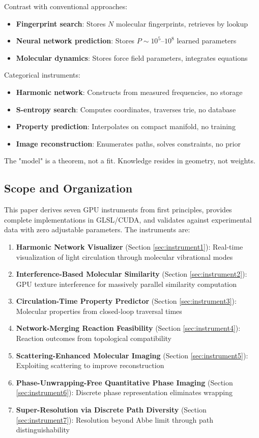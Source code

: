 \documentclass[11pt,a4paper]{article}
\theoremstyle{definition}
\theoremstyle{remark}
\begin{document}
Contrast with conventional approaches:
\begin{itemize}
\item \textbf{Fingerprint search}: Stores $N$ molecular fingerprints, retrieves by lookup
\item \textbf{Neural network prediction}: Stores $P \sim 10^5$--$10^8$ learned parameters
\item \textbf{Molecular dynamics}: Stores force field parameters, integrates equations
\end{itemize}

Categorical instruments:
\begin{itemize}
\item \textbf{Harmonic network}: Constructs from measured frequencies, no storage
\item \textbf{S-entropy search}: Computes coordinates, traverses trie, no database
\item \textbf{Property prediction}: Interpolates on compact manifold, no training
\item \textbf{Image reconstruction}: Enumerates paths, solves constraints, no prior
\end{itemize}

The "model" is a theorem, not a fit. Knowledge resides in geometry, not weights.

\subsection{Scope and Organization}

This paper derives seven GPU instruments from first principles, provides complete implementations in GLSL/CUDA, and validates against experimental data with zero adjustable parameters. The instruments are:

\begin{enumerate}
\item \textbf{Harmonic Network Visualizer} (Section \ref{sec:instrument1}): Real-time visualization of light circulation through molecular vibrational modes
\item \textbf{Interference-Based Molecular Similarity} (Section \ref{sec:instrument2}): GPU texture interference for massively parallel similarity computation
\item \textbf{Circulation-Time Property Predictor} (Section \ref{sec:instrument3}): Molecular properties from closed-loop traversal times
\item \textbf{Network-Merging Reaction Feasibility} (Section \ref{sec:instrument4}): Reaction outcomes from topological compatibility
\item \textbf{Scattering-Enhanced Molecular Imaging} (Section \ref{sec:instrument5}): Exploiting scattering to improve reconstruction
\item \textbf{Phase-Unwrapping-Free Quantitative Phase Imaging} (Section \ref{sec:instrument6}): Discrete phase representation eliminates wrapping
\item \textbf{Super-Resolution via Discrete Path Diversity} (Section \ref{sec:instrument7}): Resolution beyond Abbe limit through path distinguishability
\end{enumerate}
\end{document}
